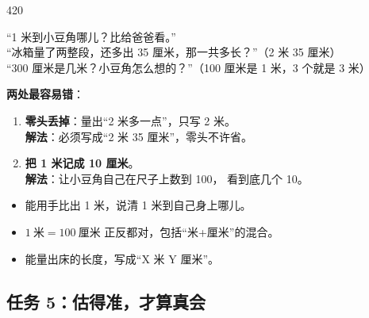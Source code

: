 \begin{lesson}{4}{20}
\begin{saybox}
“1 米到小豆角哪儿？比给爸爸看。”\\
“冰箱量了两整段，还多出 35 厘米，那一共多长？”（2 米 35 厘米）\\
“300 厘米是几米？小豆角怎么想的？”（100 厘米是 1 米，3 个就是 3 米）
\end{saybox}

\begin{pitbox}
\textbf{两处最容易错}：
\begin{enumerate}[label=\arabic*、]
  \item \textbf{零头丢掉}：量出“2 米多一点”，只写 2 米。\\
\textbf{解法}：必须写成“2 米 35 厘米”，零头不许省。
  \item \textbf{把 1 米记成 10 厘米}。\\
\textbf{解法}：让小豆角自己在尺子上数到 100，
        看到底几个 10。
\end{enumerate}
\end{pitbox}

\begin{passbox}
\begin{itemize}
  \item 能用手比出 1 米，说清 1 米到自己身上哪儿。
  \item $1\ \text{米}=100\ \text{厘米}$ 正反都对，包括“米+厘米”的混合。
  \item 能量出床的长度，写成“X 米 Y 厘米”。
\end{itemize}
\end{passbox}
\end{lesson}

\subsection{任务 5：估得准，才算真会}

